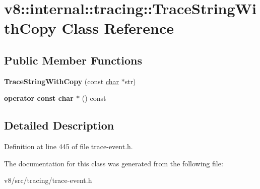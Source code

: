 \hypertarget{classv8_1_1internal_1_1tracing_1_1TraceStringWithCopy}{}\section{v8\+:\+:internal\+:\+:tracing\+:\+:Trace\+String\+With\+Copy Class Reference}
\label{classv8_1_1internal_1_1tracing_1_1TraceStringWithCopy}
\subsection*{Public Member Functions}
\begin{DoxyCompactItemize}
\item 
\mbox{\label{classv8_1_1internal_1_1tracing_1_1TraceStringWithCopy_a7b965fc3bb7e32b0f2e7d3c3550069e2}} 
{\bfseries Trace\+String\+With\+Copy} (const \mbox{\hyperlink{classchar}{char}} $\ast$str)
\item 
\mbox{\label{classv8_1_1internal_1_1tracing_1_1TraceStringWithCopy_a6954ca32706bae621d43c113e37c4f2f}} 
{\bfseries operator const char $\ast$} () const
\end{DoxyCompactItemize}


\subsection{Detailed Description}


Definition at line 445 of file trace-\/event.\+h.



The documentation for this class was generated from the following file\+:\begin{DoxyCompactItemize}
\item 
v8/src/tracing/trace-\/event.\+h\end{DoxyCompactItemize}
